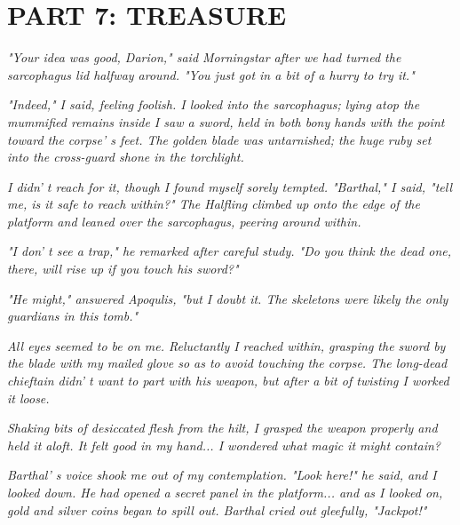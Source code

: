 \documentclass[a4paper,twoside,openany,10pt]{book}
\begin{document}
\pagebreak

\section{PART 7: TREASURE}\label{part-7-treasure}

\textit{"Your idea was good, Darion," said Morningstar after we had turned the sarcophagus lid halfway around. "You just got in a bit of a hurry to try it."}

\textit{"Indeed," I said, feeling foolish. I looked into the sarcophagus; lying atop the mummified remains inside I saw a sword, held in both bony hands with the point toward the corpse' s feet. The golden blade was untarnished; the huge ruby set into the cross-guard shone in the torchlight.}

\textit{I didn' t reach for it, though I found myself sorely tempted. "Barthal," I said, "tell me, is it safe to reach within?" The Halfling climbed up onto the edge of the platform and leaned over the sarcophagus, peering around within.}

\textit{"I don' t see a trap," he remarked after careful study. "Do you think the dead one, there, will rise up if you touch his sword?"}

\textit{"He might," answered Apoqulis, "but I doubt it. The skeletons were likely the only guardians in this tomb."}

\textit{All eyes seemed to be on me. Reluctantly I reached within, grasping the sword by the blade with my mailed glove so as to avoid touching the corpse. The long-dead chieftain didn' t want to part with his weapon, but after a bit of twisting I worked it loose.}

\textit{Shaking bits of desiccated flesh from the hilt, I grasped the weapon properly and held it aloft. It felt good in my hand... I wondered what magic it might contain?}

\textit{Barthal' s voice shook me out of my contemplation. "Look here!" he said, and I looked down. He had opened a secret panel in the platform... and as I looked on, gold  and silver coins began to spill out. Barthal cried out gleefully, "Jackpot!"}
\end{document}

